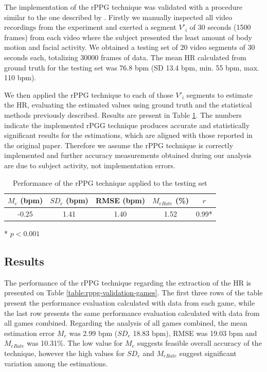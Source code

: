 The implementation of the rPPG technique was validated with a procedure similar to the one described by \textcite{li2014remote}. Firstly we manually inspected all video recordings from the experiment and exerted a segment $V'_i$ of 30 seconds (1500 frames) from each video where the subject presented the least amount of body motion and facial activity. We obtained a testing set of 20 video segments of 30 seconds each, totalizing 30000 frames of data. The mean HR calculated from ground truth for the testing set was 76.8 bpm (SD 13.4 bpm, min. 55 bpm, max. 110 bpm).

We then applied the rPPG technique to each of those $V'_i$ segments to estimate the HR, evaluating the estimated values using ground truth and the statistical methods previously described. Results are present in Table \ref{table:rppg-validation}. The numbers indicate the implemented rPGG technique produces accurate and statistically significant results for the estimations, which are aligned with those reported in the original paper. Therefore we assume the rPPG technique is correctly implemented and further accuracy measurements obtained during our analysis are due to subject activity, not implementation errors.

\begin{table}
\centering
\begin{threeparttable}
  \begin{tabular}{ccccc}
  \toprule
    $M_e$ (bpm) & $SD_e$ (bpm) & RMSE (bpm) & $M_{eRate}$ (\%) & $r$ \\
  \midrule
    -0.25 & 1.41 & 1.40 & 1.52 & 0.99* \\
  \bottomrule
  \end{tabular}
  \begin{tablenotes}
    \small
    \item[*]{$p < 0.001$}
  \end{tablenotes}
\end{threeparttable}
\caption{Performance of the rPPG technique applied to the testing set}
\label{table:rppg-validation}
\end{table}

\subsection{Results}

The performance of the rPPG technique regarding the extraction of the HR is presented on Table \ref{table:rppg-validation-games}. The first three rows of the table present the performance evaluation calculated with data from each game, while the last row presents the same performance evaluation calculated with data from all games combined. Regarding the analysis of all games combined, the mean estimation error $M_e$ was 2.99 bpm ($SD_e$ 18.83 bpm), RMSE was 19.03 bpm and $M_{eRate}$ was 10.31\%. The low value for $M_e$ suggests feasible overall accuracy of the technique, however the high values for $SD_e$ and $M_{eRate}$ suggest significant variation among the estimations.

